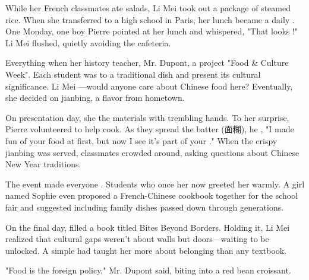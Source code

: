 \documentclass{英语试卷}
\begin{document}
\par While her French classmates ate salads, Li Mei took out a package of steamed rice. When she transferred to a high school in Paris, her lunch became a daily . One Monday, one boy Pierre pointed at her lunch and whispered, "That looks !" Li Mei flushed, quietly avoiding the cafeteria.\par
\par Everything  when her history teacher, Mr. Dupont,  a project "Food \& Culture Week". Each student was to  a traditional dish and present its cultural significance. Li Mei  —would anyone care about Chinese food here? Eventually, she decided on jianbing, a flavor from hometown.\par
\par On presentation day, she  the materials with trembling hands. To her surprise, Pierre volunteered to help cook. As they spread the batter (面糊), he , "I made fun of your food at first, but now I see it's part of your ." When the crispy jianbing was served, classmates crowded around, asking questions about Chinese New Year traditions.\par
\par The event made everyone . Students who once  her now greeted her warmly. A girl named Sophie even proposed  a French-Chinese cookbook together for the school fair and suggested including family dishes passed down through generations.\par
\par On the final day,  filled a book titled Bites Beyond Borders. Holding it, Li Mei realized that cultural gaps weren't about walls but doors—waiting to be unlocked. A simple  had taught her more about belonging than any textbook.\par
\par "Food is the  foreign policy," Mr. Dupont said, biting into a red bean croissant.\par
{}
\end{document}
